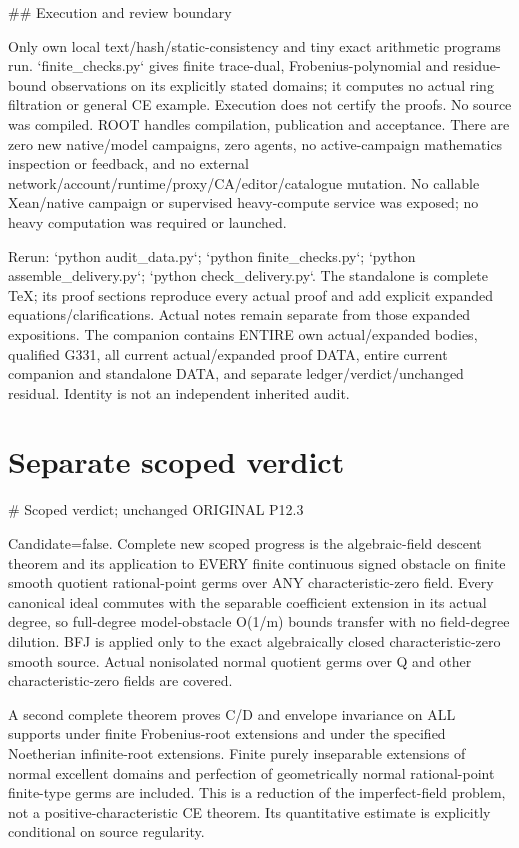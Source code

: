 \documentclass[11pt]{article}
\begin{document}
\#\# Execution and review boundary

Only own local text/hash/static-consistency and tiny exact arithmetic programs run. `finite\_checks.py` gives finite trace-dual, Frobenius-polynomial and residue-bound observations on its explicitly stated domains; it computes no actual ring filtration or general CE example. Execution does not certify the proofs. No source was compiled. ROOT handles compilation, publication and acceptance. There are zero new native/model campaigns, zero agents, no active-campaign mathematics inspection or feedback, and no external network/account/runtime/proxy/CA/editor/catalogue mutation. No callable Xean/native campaign or supervised heavy-compute service was exposed; no heavy computation was required or launched.

Rerun: `python audit\_data.py`; `python finite\_checks.py`; `python assemble\_delivery.py`; `python check\_delivery.py`. The standalone is complete TeX; its proof sections reproduce every actual proof and add explicit expanded equations/clarifications. Actual notes remain separate from those expanded expositions. The companion contains ENTIRE own actual/expanded bodies, qualified G331, all current actual/expanded proof DATA, entire current companion and standalone DATA, and separate ledger/verdict/unchanged residual. Identity is not an independent inherited audit.


\section*{Separate scoped verdict}
\# Scoped verdict; unchanged ORIGINAL P12.3

Candidate=false. Complete new scoped progress is the algebraic-field descent theorem and its application to EVERY finite continuous signed obstacle on finite smooth quotient rational-point germs over ANY characteristic-zero field. Every canonical ideal commutes with the separable coefficient extension in its actual degree, so full-degree model-obstacle O(1/m) bounds transfer with no field-degree dilution. BFJ is applied only to the exact algebraically closed characteristic-zero smooth source. Actual nonisolated normal quotient germs over Q and other characteristic-zero fields are covered.

A second complete theorem proves C/D and envelope invariance on ALL supports under finite Frobenius-root extensions and under the specified Noetherian infinite-root extensions. Finite purely inseparable extensions of normal excellent domains and perfection of geometrically normal rational-point finite-type germs are included. This is a reduction of the imperfect-field problem, not a positive-characteristic CE theorem. Its quantitative estimate is explicitly conditional on source regularity.
\end{document}

